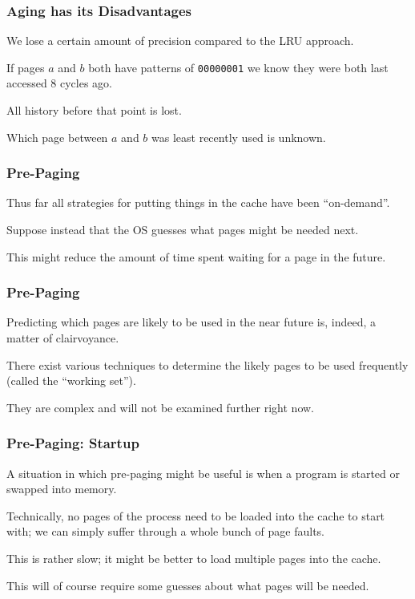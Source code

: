 \begin{frame}
\frametitle{Aging has its Disadvantages}

We lose a certain amount of precision compared to the LRU approach.

If pages $a$ and $b$ both have patterns of \texttt{00000001} we know they were both last accessed 8 cycles ago. 

All history before that point is lost. 

Which page between $a$ and $b$ was least recently used is unknown.


\end{frame}

\begin{frame}
\frametitle{Pre-Paging}

Thus far all strategies for putting things in the cache have been ``on-demand''.
 
Suppose instead that the OS guesses what pages might be needed next.

This might reduce the amount of time spent waiting for a page in the future.

\end{frame}

\begin{frame}
\frametitle{Pre-Paging}

Predicting which pages are likely to be used in the near future is, indeed, a matter of clairvoyance. 

There exist various techniques to determine the likely pages to be used frequently (called the ``working set'').

They are complex and will not be examined further right now.

\end{frame}

\begin{frame}
\frametitle{Pre-Paging: Startup}

A situation in which pre-paging might be useful is when a program is started or swapped into memory. 

Technically, no pages of the process need to be loaded into the cache to start with; we can simply suffer through a whole bunch of page faults. 

This is rather slow; it might be better to load multiple pages into the cache.

This will of course require some guesses about what pages will be needed.

\end{frame}

